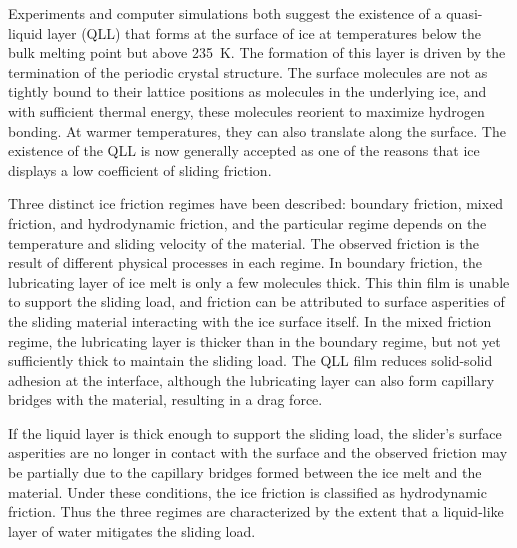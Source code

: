 Experiments and computer simulations both suggest the existence of a
quasi-liquid layer (QLL) that forms at the surface of ice at
temperatures below the bulk melting point but above
235~K.\cite{Kroes1992,Ikeda-Fukazawa2004,Picaud2006,Conde2008,Bartels-Rausch2014,Sancheza2017}
The formation of this layer is driven by the termination of the
periodic crystal structure. The surface molecules are not as tightly
bound to their lattice positions as molecules in the underlying ice,
and with sufficient thermal energy, these molecules reorient to
maximize hydrogen bonding. At warmer temperatures, they can also
translate along the surface.\cite{Pfalzgraff2011,Bartels-Rausch2014}
The existence of the QLL is now generally accepted as one of the
reasons that ice displays a low coefficient of sliding
friction.\cite{Dash1995,Rosenberg2005,Dash2006,Malenkov2009}

Three distinct ice friction regimes have been described:
boundary friction, mixed friction, and hydrodynamic friction, and the
particular regime depends on the temperature and sliding velocity of
the
material.\cite{Bhushan2002,Kietzig2009,Kietzig2010,Persson2015,Tuononen2016}
The observed friction is the result of different physical processes in
each regime. In boundary friction, the lubricating layer of ice melt
is only a few molecules thick. This thin film is unable to support the
sliding load, and friction can be attributed to surface asperities of
the sliding material interacting with the ice surface
itself.\cite{Bhushan2002} In the mixed friction regime, the
lubricating layer is thicker than in the boundary regime, but not yet
sufficiently thick to maintain the sliding load. The QLL film reduces
solid-solid adhesion at the interface, although the lubricating layer
can also form capillary bridges with the material, resulting in a drag
force.\cite{Kietzig2009,Kietzig2010}

If the liquid layer is thick enough to support the sliding load, the
slider's surface asperities are no longer in contact with the surface
and the observed friction may be partially due to the capillary
bridges formed between the ice melt and the material. Under these
conditions, the ice friction is classified as hydrodynamic
friction.\cite{Kietzig2009,Kietzig2010} Thus the three regimes are
characterized by the extent that a liquid-like layer of water
mitigates the sliding load.

